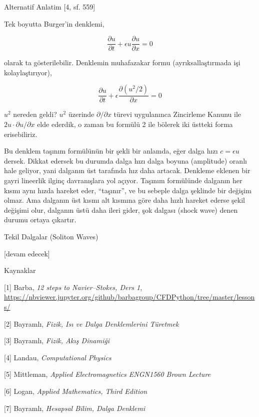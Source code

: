 \documentclass[12pt,fleqn]{article}\usepackage{../../common}
\begin{document}
Alternatif Anlatim [4, sf. 559]

Tek boyutta Burger'in denklemi,

$$
\frac{\partial u}{\partial t} + \epsilon u \frac{\partial u}{\partial x} = 0
$$

olarak ta gösterilebilir. Denklemin muhafazakar formu (ayrıksallaştırmada işi
kolaylaştırıyor),

$$
\frac{\partial u}{\partial t} + \epsilon \frac{\partial (u^2 / 2)}{\partial x} = 0
$$

$u^2$ nereden geldi? $u^2$ üzerinde $\partial / \partial x$ türevi uygulanınca
Zincirleme Kanunu ile $2 u \cdot \partial u / \partial x$ elde ederdik, o zaman
bu formülü 2 ile bölerek iki üstteki forma erisebiliriz.

Bu denklem taşınım formülünün bir şekli bir anlamda, eğer dalga hızı
$c = \epsilon u$ dersek. Dikkat edersek bu durumda dalga hızı dalga boyuna
(amplitude) oranlı hale geliyor, yani dalganın üst tarafında hız daha artacak.
Denkleme eklenen bir gayri lineerlik ilginç davranışlara yol açıyor. Taşınım
formülünde dalganın her kısmı aynı hızda hareket eder, ``taşınır'', ve bu
sebeple dalga şeklinde bir değişim olmaz. Ama dalganın üst kısmı alt kısmına
göre daha hızlı hareket ederse şekil değişimi olur, dalganın üstü daha ileri
gider, şok dalgası (shock wave) denen durumu ortaya çıkartır. 

Tekil Dalgalar (Soliton Waves)















[devam edecek]

Kaynaklar

[1] Barba, {\em 12 steps to Navier–Stokes, Ders 1},
    \url{https://nbviewer.jupyter.org/github/barbagroup/CFDPython/tree/master/lessons/}

[2] Bayramlı, {\em Fizik, Isı ve Dalga Denklemlerini Türetmek}

[3] Bayramlı, {\em Fizik, Akış Dinamiği}

[4] Landau, {\em Computational Physics}

[5] Mittleman, {\em Applied Electromagnetics ENGN1560 Brown Lecture}

[6] Logan, {\em Applied Mathematics, Third Edition}

[7] Bayramlı, {\em Hesapsal Bilim, Dalga Denklemi}
\end{document}
